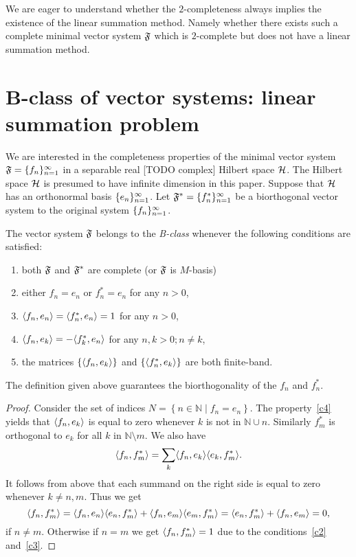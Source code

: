 \documentclass[12pt]{amsart}
\begin{document}
    We are eager to understand whether the $2$-completeness always implies the existence of the linear summation method.
    Namely whether there exists such a complete minimal vector system $\fsys$ which is $2$-complete but does not have a
      linear summation method.

\section{B-class of vector systems: linear summation problem}
    \label{fsys2graphs}
    We are interested in the completeness properties of the minimal vector system $\fsys = \seq{f}$
      in a separable real [TODO complex] Hilbert space $\cal{H}$.
    The Hilbert space $\cal{H}$ is presumed to have infinite dimension in this paper.
    Suppose that $\cal{H}$ has an orthonormal basis $\seq{e}$.
    Let $\fstarsys = \{f_n^{*}\}_{n=1}^\infty$ be a biorthogonal vector system to the original system $\seq{f}$.
    \begin{definition}
      The vector system $\fsys$ belongs to the \emph{B-class} whenever the following conditions are satisfied:
      \begin{enumerate}[label=\textbf{C\arabic*}]
        \item \label{c1} both $\fsys$ and $\fstarsys$ are complete (or $\fsys$ is $M$-basis)
        \item either $f_n = e_n$ or $f^*_n = e_n$ for any $n > 0$,
        \item \label{c3} $\inner{f_n}{e_n} = \inner{f^*_n}{e_n} = 1$ for any $n > 0$,
        \item \label{c4} $\inner{f_n}{e_k} = -\inner{f^*_k}{e_n}$ for any $n, k > 0; n \neq k$,
        \item \label{c5} the matrices $\{\inner{f_n}{e_k}\}$ and $\{\inner{f^*_n}{e_k}\}$ are both finite-band.
      \end{enumerate}
    \end{definition}
    \begin{prop}
      The definition given above guarantees the biorthogonality of the $f_n$ and $f^*_n$.
    \end{prop}
    \begin{proof}
      Consider the set of indices $N = \left\{n \in \mathbb{N} \mid f_n = e_n \right\}$.
      The property~\ref{c4} yields that $\inner{f_n}{e_k}$ is equal to zero whenever $k$ is not in
        $\mathbb{N} \cup {n}$.
      Similarly $f^*_m$ is orthogonal to $e_k$ for all $k$ in $\mathbb{N} \setminus {m}$.
      We also have
      \[
        \inner{f_n}{f^*_m} = \sum_{k} \inner{f_n}{e_k} \inner{e_k}{f^*_m}.
      \]
      It follows from above that each summand on the right side is equal to zero whenever $k \neq n, m$.
      Thus we get
      \[
        \inner{f_n}{f^*_m} = \inner{f_n}{e_n} \inner{e_n}{f^*_m} + \inner{f_n}{e_m} \inner{e_m}{f^*_m}
        = \inner{e_n}{f^*_m} + \inner{f_n}{e_m} = 0,
      \]
      if $n \neq m$.
      Otherwise if $n = m$ we get $\inner{f_n}{f^*_m} = 1$ due to the conditions~\ref{c2} and~\ref{c3}.
    \end{proof}
\end{document}

